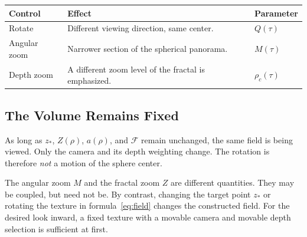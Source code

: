 \documentclass[11pt,a4paper]{article}
\numberwithin{equation}{section}
\newcommand{\vct}[1]{\boldsymbol{#1}}
\newcommand{\F}{\mathcal F}
\begin{document}
\begin{center}
\end{center}

\begin{tabularx}{\linewidth}{@{}l>{\raggedright\arraybackslash}X>{\raggedright\arraybackslash}X@{}}
\toprule
\textbf{Control} & \textbf{Effect} & \textbf{Parameter}\\
\midrule
Rotate & Different viewing direction, same center. & $Q(\tau)$\\
Angular zoom & Narrower section of the spherical panorama. & $M(\tau)$\\
Depth zoom & A different zoom level of the fractal is emphasized. & $\rho_c(\tau)$\\
\bottomrule
\end{tabularx}

\subsection{The Volume Remains Fixed}
As long as $z_\ast$, $Z(\rho)$, $a(\rho)$, and $\F$ remain unchanged, the same field
is being viewed. Only the camera and its depth weighting change. The rotation is
therefore \emph{not} a motion of the sphere center.

The angular zoom $M$ and the fractal zoom $Z$ are different quantities. They may be
coupled, but need not be. By contrast, changing the target point $z_\ast$ or rotating
the texture in formula~\eqref{eq:field} changes the constructed field. For the desired
look inward, a fixed texture with a movable camera and movable depth selection is
sufficient at first.
\end{document}
